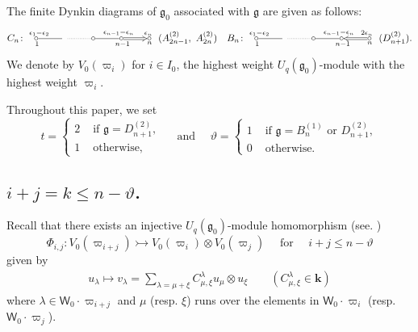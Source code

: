 \documentclass[11pt, leqno]{amsart}
\theoremstyle{definition}
\numberwithin{equation}{section}
\begin{document}
The finite Dynkin diagrams of ${\mathfrak g}_0$ associated with ${\mathfrak g}$ are given as follows:
$$
C_n\colon\xymatrix@R=3ex{ *{\circ}<3pt> \ar@{-}[r]_<{1 \
}^{\epsilon_1-\epsilon_2 \qquad \ } & {} \ar@{.}[r] & *{\circ}<3pt>
\ar@{-}[r]_>{\,\,\,\ n-1}^{ \qquad \  \epsilon_{n-1}-\epsilon_{n} }
&*{\circ}<3pt>\ar@{=>}[r]_>{\,\,\,\,n}^{ \qquad \ \  \epsilon_n }
&*{\circ}<3pt> } \ (A^{(2)}_{2n-1}, \ A^{(2)}_{2n}) \quad B_n\colon\xymatrix@R=3ex{ *{\circ}<3pt>
\ar@{-}[r]_<{1 \ }^{\epsilon_1-\epsilon_2 \qquad \ }   & {}
\ar@{.}[r] & *{\circ}<3pt> \ar@{-}[r]_>{\,\,\,\ n-1}^{ \qquad \
\epsilon_{n-1}-\epsilon_{n} }
&*{\circ}<3pt>\ar@{<=}[r]_>{\,\,\,\,n}^{ \qquad \ 2\epsilon_n }
&*{\circ}<3pt> } \ (D^{(2)}_{n+1}).
$$
We denote by $V_0({\varpi}_i)$ for $i \in I_0$, the highest weight $U_q({\mathfrak g}_0)$-module with the highest weight ${\varpi}_i$.
\medskip

Throughout this paper, we set
\begin{equation}\label{def: t}
t= \begin{cases} 2 & \text{ if } {\mathfrak g}=D^{(2)}_{n+1}, \\ 1 & \text{ otherwise,} \end{cases} \quad \text{ and } \quad
\vartheta= \begin{cases} 1 & \text{ if } {\mathfrak g}=B^{(1)}_{n} \text{ or } D^{(2)}_{n+1}, \\ 0 & \text{ otherwise.} \end{cases}
\end{equation}

\subsection{$i+j=k \le n-\vartheta$.}\label{subsec: i+j=k}

Recall that there exists an injective $U_q({\mathfrak g}_0)$-module homomorphism (see. \cite[Chapter 8]{HK02})
$$ \Phi_{i,j}:V_0({\varpi}_{i+j}) \rightarrowtail V_0({\varpi}_{i}) \otimes V_0({\varpi}_{j})  \quad \text{ for } \quad i+j \le n -\vartheta$$
given by
\begin{align} \label{map: injection g_0}
u_\lambda \longmapsto v_\lambda= \sum_{\lambda=\mu+\xi}
C_{\mu,\xi}^{\lambda} u_\mu \otimes u_\xi \qquad (C_{\mu,\xi}^{\lambda} \in {\mathbf{k}})
\end{align}
where $\lambda \in \mathsf{W}_0\cdot{\varpi}_{i+j}$ and $\mu$ (resp. $\xi$) runs
over the elements in $\mathsf{W}_0\cdot{\varpi}_{i}$ (resp. $\mathsf{W}_0\cdot{\varpi}_{j}$).
\end{document}
